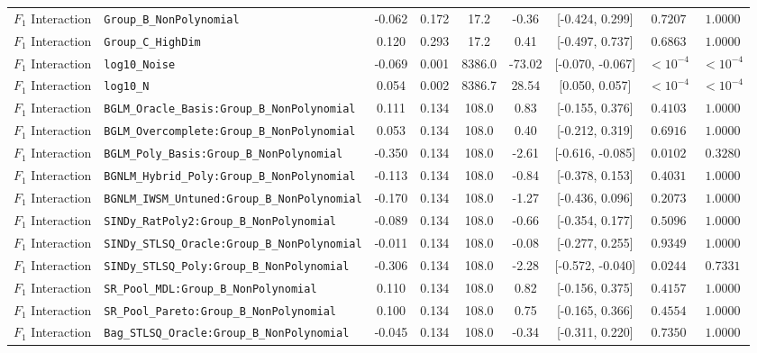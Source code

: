 \begin{table}[t]
\begin{tabular}{llccccccc}
$F_1$ Interaction & \texttt{Group\_B\_NonPolynomial} & -0.062 & 0.172 & 17.2 & -0.36 & [-0.424, 0.299] & $0.7207$ & $1.0000$ \\
$F_1$ Interaction & \texttt{Group\_C\_HighDim} & 0.120 & 0.293 & 17.2 & 0.41 & [-0.497, 0.737] & $0.6863$ & $1.0000$ \\
$F_1$ Interaction & \texttt{log10\_Noise} & -0.069 & 0.001 & 8386.0 & -73.02 & [-0.070, -0.067] & $< 10^{-4}$ & $< 10^{-4}$ \\
$F_1$ Interaction & \texttt{log10\_N} & 0.054 & 0.002 & 8386.7 & 28.54 & [0.050, 0.057] & $< 10^{-4}$ & $< 10^{-4}$ \\
$F_1$ Interaction & \texttt{BGLM\_Oracle\_Basis:Group\_B\_NonPolynomial} & 0.111 & 0.134 & 108.0 & 0.83 & [-0.155, 0.376] & $0.4103$ & $1.0000$ \\
$F_1$ Interaction & \texttt{BGLM\_Overcomplete:Group\_B\_NonPolynomial} & 0.053 & 0.134 & 108.0 & 0.40 & [-0.212, 0.319] & $0.6916$ & $1.0000$ \\
$F_1$ Interaction & \texttt{BGLM\_Poly\_Basis:Group\_B\_NonPolynomial} & -0.350 & 0.134 & 108.0 & -2.61 & [-0.616, -0.085] & $0.0102$ & $0.3280$ \\
$F_1$ Interaction & \texttt{BGNLM\_Hybrid\_Poly:Group\_B\_NonPolynomial} & -0.113 & 0.134 & 108.0 & -0.84 & [-0.378, 0.153] & $0.4031$ & $1.0000$ \\
$F_1$ Interaction & \texttt{BGNLM\_IWSM\_Untuned:Group\_B\_NonPolynomial} & -0.170 & 0.134 & 108.0 & -1.27 & [-0.436, 0.096] & $0.2073$ & $1.0000$ \\
$F_1$ Interaction & \texttt{SINDy\_RatPoly2:Group\_B\_NonPolynomial} & -0.089 & 0.134 & 108.0 & -0.66 & [-0.354, 0.177] & $0.5096$ & $1.0000$ \\
$F_1$ Interaction & \texttt{SINDy\_STLSQ\_Oracle:Group\_B\_NonPolynomial} & -0.011 & 0.134 & 108.0 & -0.08 & [-0.277, 0.255] & $0.9349$ & $1.0000$ \\
$F_1$ Interaction & \texttt{SINDy\_STLSQ\_Poly:Group\_B\_NonPolynomial} & -0.306 & 0.134 & 108.0 & -2.28 & [-0.572, -0.040] & $0.0244$ & $0.7331$ \\
$F_1$ Interaction & \texttt{SR\_Pool\_MDL:Group\_B\_NonPolynomial} & 0.110 & 0.134 & 108.0 & 0.82 & [-0.156, 0.375] & $0.4157$ & $1.0000$ \\
$F_1$ Interaction & \texttt{SR\_Pool\_Pareto:Group\_B\_NonPolynomial} & 0.100 & 0.134 & 108.0 & 0.75 & [-0.165, 0.366] & $0.4554$ & $1.0000$ \\
$F_1$ Interaction & \texttt{Bag\_STLSQ\_Oracle:Group\_B\_NonPolynomial} & -0.045 & 0.134 & 108.0 & -0.34 & [-0.311, 0.220] & $0.7350$ & $1.0000$ \\

\end{tabular}
\end{table}
